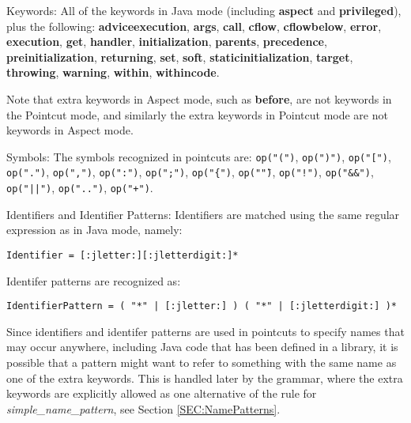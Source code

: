 \begin{description}
\item{Keywords:}
All of the keywords in {\sc Java} mode (including
{\bf aspect} and {\bf privileged}), plus the following:
{\bf adviceexecution}, {\bf args}, {\bf call}, {\bf cflow}, 
{\bf cflowbelow}, {\bf error}, {\bf execution}, {\bf get},
{\bf handler}, {\bf initialization}, {\bf parents}, {\bf precedence},
{\bf preinitialization}, {\bf returning}, {\bf set}, {\bf soft},
{\bf staticinitialization}, {\bf target}, {\bf throwing}, 
{\bf warning}, {\bf within}, {\bf withincode}.

Note that extra keywords in {\sc Aspect} mode,  such as {\bf before}, are
not keywords in the {\sc Pointcut} mode, and similarly the extra keywords
in {\sc Pointcut} mode are not keywords in {\sc Aspect} mode.    

\item{Symbols:}
The symbols recognized in pointcuts are: 
{\tt op("(")}, {\tt op(")")}, {\tt op("[")}, {\tt op(".")},
{\tt op(",")}, {\tt op(":")}, {\tt op(";")}, {\tt op("\{")},
{\tt op("\"")}, {\tt op("!")}, {\tt op("\&\&")}, {\tt op("||")},
{\tt op("..")}, {\tt op("+")}. 

\item{Identifiers and Identifier Patterns:}  Identifiers are matched
using the same regular expression as in {\sc Java} mode, namely:

{\tt Identifier = [:jletter:][:jletterdigit:]*}

\noindent
Identifer patterns are recognized as:

{\tt IdentifierPattern = ( "*" | [:jletter:] ) ( "*" | [:jletterdigit:] )*}

Since identifiers and identifer patterns are used in pointcuts to
specify names that may occur anywhere, including Java code that has
been defined in a library,  it is possible that a pattern might want
to refer to something with the same name as one of the extra keywords.
This is handled later by the grammar,  where the extra keywords are
explicitly allowed as one alternative of the rule for 
{\em simple\_name\_pattern},  see Section \ref{SEC:NamePatterns}.
\end{description}


